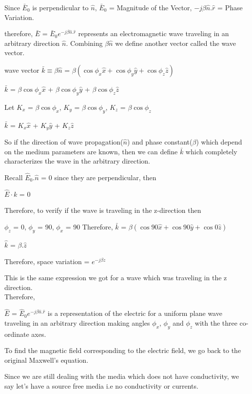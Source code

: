 Since $\bar{E}_{0}$ is perpendicular to $\hat{n}$,
$\bar{E}_{0}$ = Magnitude of the Vector,
$-j\beta \hat{n}.\hat{r}$ = Phase Variation.

therefore, $\bar{E}$ = $\bar{E}_{0}e^{-j\beta \hat{n}.\hat{r}}$ represents an electromagnetic wave traveling in an arbitrary direction $\hat{n}$.
Combining $\beta\hat{n}$ we define another vector called the wave vector.

wave vector $\bar{k} \equiv \beta \hat{n}$ = $\beta(\cos\phi_{x}\hat{x} + \cos\phi_{y}\hat{y} + \cos\phi_{z}\hat{z})$
\begin{center}
$\bar{k}$ = $\beta\cos\phi_{x}\hat{x}$ + $\beta\cos\phi_{y}\hat{y}$ + $\beta\cos\phi_{z}\hat{z}$
\end{center}
Let $K_{x}$ = $\beta\cos\phi_{x}$, $K_{y}$ = $\beta\cos\phi_{y}$, 
$K_{z}$ = $\beta\cos\phi_{z}$

$\bar{k}$ = $K_{x}\hat{x}$ + $K_{y}\hat{y}$ + $K_{z}\hat{z}$

So if the direction of wave propagation($\hat{n}$) and phase constant($\beta$) which depend on the medium parameters are known, then we can define $\bar{k}$ which completely characterizes the wave in the arbitrary direction.

Recall $\hat{E}_{0}.\hat{n}$ = 0 since they are perpendicular, then
\begin{center}
$\hat{E}\cdot k$ = 0
\end{center}
Therefore, to verify if the wave is traveling in the z-direction then
\begin{center}
$\phi_{z}$ = 0, $\phi_{y}$ = 90\textdegree, $\phi_{x}$ = 90\textdegree
Therefore, $\bar{k}$ = $\beta(\cos90\hat{x} + \cos90\hat{y} + \cos0\hat{z})$

$\hat{k}$ = $\beta.\hat{z}$

Therefore, space variation = $e^{-j\beta z}$
\end{center}
This is the same expression we got for a wave which was traveling in the z direction.
\\Therefore,

$\hat{E}$ = $\hat{E}_{0} e^{-j\beta\hat{n}.\hat{r}}$ is a representation of the electric for a uniform plane wave traveling in an arbitrary direction making angles $\phi_{x}$, $\phi_{y}$ and $\phi_{z}$ with the three co-ordinate axes.


To find the magnetic field corresponding to the electric field, we go back to the original Maxwell's equation.

Since we are still dealing with the media which does not have conductivity, we say let's have a source free media i.e no conductivity or currents.

